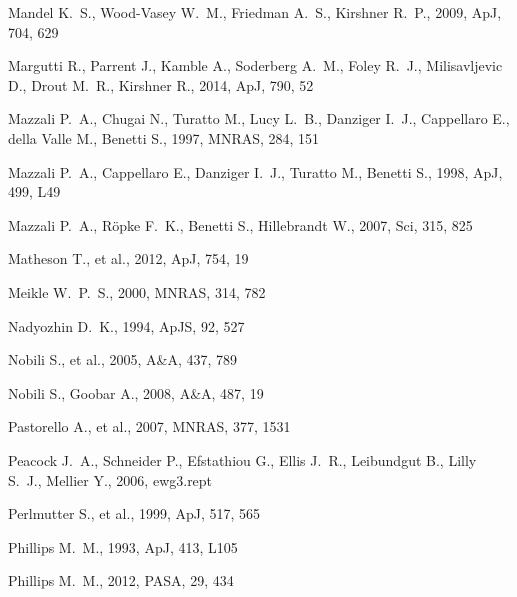 \begin{thebibliography}{99}
Mandel K.~S., Wood-Vasey W.~M., Friedman A.~S., Kirshner R.~P., 2009, ApJ, 
704, 629

 Margutti R., Parrent J., Kamble A., 
Soderberg A.~M., Foley R.~J., Milisavljevic D., Drout M.~R., Kirshner R., 
2014, ApJ, 790, 52

 Mazzali P.~A., Chugai N., Turatto M., Lucy 
L.~B., Danziger I.~J., Cappellaro E., della Valle M., Benetti S., 1997, 
MNRAS, 284, 151 

 Mazzali P.~A., Cappellaro E., Danziger 
I.~J., Turatto M., Benetti S., 1998, ApJ, 499, L49 

 Mazzali P.~A., R{\"o}pke F.~K., Benetti 
S., Hillebrandt W., 2007, Sci, 315, 825 

 Matheson T., et al., 2012, ApJ, 754, 19 

 Meikle 
W.~P.~S., 2000, MNRAS, 314, 782 

Nadyozhin D.~K., 1994, ApJS, 92, 527 

 Nobili S., et al., 2005, A\&A, 437, 789 

 Nobili S., Goobar A., 2008, A\&A, 487, 19 

 Pastorello A., et al., 2007, MNRAS, 377, 
1531 

 Peacock J.~A., Schneider P., Efstathiou 
G., Ellis J.~R., Leibundgut B., Lilly S.~J., Mellier Y., 2006, ewg3.rept 

 Perlmutter S., et al., 1999, ApJ, 517, 565 

Phillips M.~M., 1993, ApJ, 413, L105 

Phillips M.~M., 2012, PASA, 29, 434 


\end{thebibliography}
